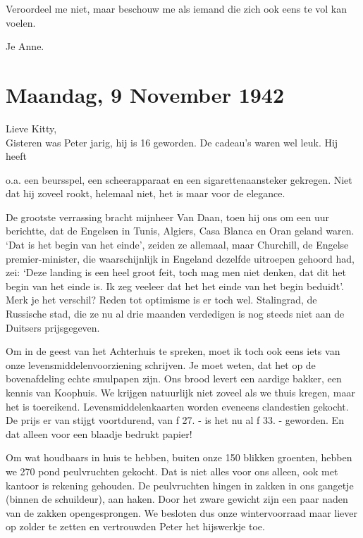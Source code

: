 \documentclass{book}
\begin{document}
Veroordeel me niet, maar beschouw me als iemand die zich ook eens te vol
kan voelen.

Je Anne.

\chapter{Maandag, 9 November 1942}

Lieve Kitty,\\Gisteren was Peter jarig, hij is 16 geworden. De cadeau's
waren wel leuk. Hij heeft

o.a. een beursspel, een scheerapparaat en een sigarettenaansteker
gekregen. Niet dat hij zoveel rookt, helemaal niet, het is maar voor de
elegance.

De grootste verrassing bracht mijnheer Van Daan, toen hij ons om een uur
berichtte, dat de Engelsen in Tunis, Algiers, Casa Blanca en Oran geland
waren. `Dat is het begin van het einde', zeiden ze allemaal, maar
Churchill, de Engelse premier-minister, die waarschijnlijk in Engeland
dezelfde uitroepen gehoord had, zei: `Deze landing is een heel groot
feit, toch mag men niet denken, dat dit het begin van het einde is. Ik
zeg veeleer dat het het einde van het begin beduidt'. Merk je het
verschil? Reden tot optimisme is er toch wel. Stalingrad, de Russische
stad, die ze nu al drie maanden verdedigen is nog steeds niet aan de
Duitsers prijsgegeven.

Om in de geest van het Achterhuis te spreken, moet ik toch ook eens iets
van onze levensmiddelenvoorziening schrijven. Je moet weten, dat het op
de bovenafdeling echte smulpapen zijn. Ons brood levert een aardige
bakker, een kennis van Koophuis. We krijgen natuurlijk niet zoveel als
we thuis kregen, maar het is toereikend. Levensmiddelenkaarten worden
eveneens clandestien gekocht. De prijs er van stijgt voortdurend, van ƒ
27. - is het nu al ƒ 33. - geworden. En dat alleen voor een blaadje
bedrukt papier!

Om wat houdbaars in huis te hebben, buiten onze 150 blikken groenten,
hebben we 270 pond peulvruchten gekocht. Dat is niet alles voor ons
alleen, ook met kantoor is rekening gehouden. De peulvruchten hingen in
zakken in ons gangetje (binnen de schuildeur), aan haken. Door het zware
gewicht zijn een paar naden van de zakken opengesprongen. We besloten
dus onze wintervoorraad maar liever op zolder te zetten en vertrouwden
Peter het hijswerkje toe.
\end{document}
